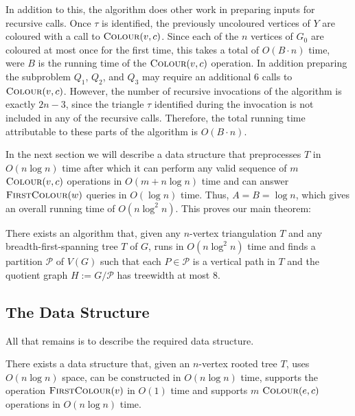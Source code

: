 \documentclass[kpfonts]{patmorin}
\begin{document}
In addition to this, the algorithm does other work in preparing inputs for recursive calls.  Once $\tau$ is identified, the previously uncoloured vertices of $Y$ are coloured with a call to $\textsc{Colour}(v,c)$.  Since each of the $n$ vertices of $G_0$ are coloured at most once for the first time, this takes a total of $O(B\cdot n)$ time, were $B$ is the running time of the $\textsc{Colour}(v,c)$ operation.  In addition preparing the subproblem $Q_1$, $Q_2$, and $Q_3$ may require an additional 6 calls to $\textsc{Colour}(v,c)$. However, the number of recursive invocations of the algorithm is exactly $2n-3$, since the triangle $\tau$ identified during the invocation is not included in any of the recursive calls.  Therefore, the total running time attributable to these parts of the algorithm is $O(B\cdot n)$.

In the next section we will describe a data structure that preprocesses $T$ in $O(n\log n)$ time after which it can perform any valid sequence of $m$ $\textsc{Colour}(v,c)$ operations in $O(m + n\log n)$ time and can answer $\textsc{FirstColour}(w)$ queries in $O(\log n)$ time.  Thus, $A=B=\log n$, which gives an overall running time of $O(n\log^2 n)$.  This proves our main theorem:

\begin{thm}
  There exists an algorithm that, given any $n$-vertex triangulation $T$ and any breadth-first-spanning tree $T$ of $G$, runs in $O(n\log^2 n)$ time and finds a partition $\mathcal{P}$ of $V(G)$ such that each $P\in\mathcal{P}$ is a vertical path in $T$ and the quotient graph $H:=G/\mathcal{P}$ has treewidth at most $8$.
\end{thm}


\subsection{The Data Structure}

All that remains is to describe the required data structure.

 \begin{lem}
   There exists a data structure that, given an $n$-vertex rooted tree $T$, uses $O(n\log n)$ space, can be constructed in $O(n\log n)$ time, supports the operation $\textsc{FirstColour}(v)$ in $O(1)$ time and supports $m$ $\textsc{Colour}(e,c)$ operations in $O(n\log n)$ time.
 \end{lem}
\end{document}
